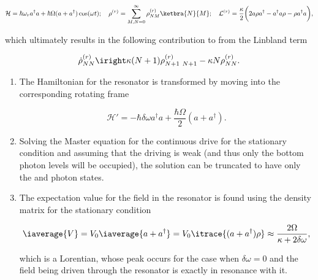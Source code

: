\begin{equation}\label{ar2}
  \mathcal{H} = \hbar\omega_ra^{\dagger}a+\hbar\Omega(a+a^{\dagger})\cos(\omega t);\quad\rho^{(r)} = \sum_{M,N=0}^{\infty}\rho_{NM}^{(r)}\ketbra{N}{M};\quad \mathcal{L}^{(r)} = \frac{\kappa}{2}\bigg(2a\rho a^{\dagger}-a^{\dagger}a\rho-\rho a^{\dagger}a\bigg),
\end{equation}

\noindent  which   ultimately  results  in   the  following
contribution to from the Linbland term

\begin{equation}\label{ar3}
  \dot{\rho}_{NN}^{(r)} \iright \kappa(N+1)\rho_{N+1\ N+1}^{(r)} - \kappa N \rho_{NN}^{(r)}.
\end{equation}


\begin{enumerate}
\item The  Hamiltonian for the resonator  is transformed by
  moving into the corresponding rotating frame
	
	\begin{equation}\label{ar4}
          \mathcal{H'} = -\hbar\delta\omega a^{\dagger}a+\frac{\hbar\Omega}{2}(a+a^{\dagger}).
	\end{equation}
	
      \item Solving the Master  equation for the continuous
        drive  for the  stationary  condition and  assuming
        that the driving is weak  (and thus only the bottom
        photon levels  will be occupied), the  solution can
        be truncated to have only the  and 
        photon states.
	
	\begin{figure}[h]
           
	\end{figure}
	
      \item  The expectation  value  for the  field in  the
        resonator is found using the density matrix for the
        stationary condition
	
	\begin{equation}\label{filedRes}
          \iaverage{V} = V_0\iaverage{a+a^{\dagger}} = V_0\itrace{(a+a^{\dagger})\rho}\approx\frac{2\Omega}{\kappa+2\delta\omega},
	\end{equation}
	
	\noindent which  is a Lorentian, whose  peak occurs
        for  the case  when $  \delta\omega=0 $  and the  field being
        driven   through  the   resonator  is   exactly  in
        resonance with it.
      \end{enumerate}

